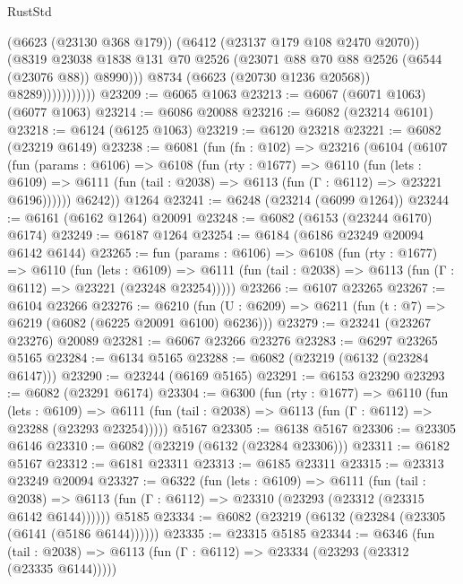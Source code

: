 \begin{lexlean}{RustStd}
\begin{coremodule}
                            (@6623 (@23130 @368 @179))
                            (@6412 (@23137 @179 @108 @2470 @2070))
                            (@8319
                              @23038
                              @1838
                              @131
                              @70
                              @2526
                              (@23071 @88 @70 @88 @2526 (@6544 (@23076 @88)) @8990)))
                          @8734
                          (@6623 (@20730 @1236 @20568))
                          @8289)))))))))))
@23209 := @6065 @1063
@23213 := @6067 (@6071 @1063) (@6077 @1063)
@23214 := @6086 @20088
@23216 := @6082 (@23214 @6101)
@23218 := @6124 (@6125 @1063)
@23219 := @6120 @23218
@23221 := @6082 (@23219 @6149)
@23238 := @6081
    (fun (fn : @102) =>
    @23216
      (@6104
        (@6107
          (fun (params : @6106) =>
          @6108
            (fun (rty : @1677) =>
            @6110
              (fun (lets : @6109) =>
              @6111 (fun (tail : @2038) => @6113 (fun (Γ : @6112) => @23221 @6196))))))
        @6242))
    @1264
@23241 := @6248 (@23214 (@6099 @1264))
@23244 := @6161 (@6162 @1264) @20091
@23248 := @6082 (@6153 (@23244 @6170) @6174)
@23249 := @6187 @1264
@23254 := @6184 (@6186 @23249 @20094 @6142 @6144)
@23265 := fun (params : @6106) =>
  @6108
    (fun (rty : @1677) =>
    @6110
      (fun (lets : @6109) =>
      @6111 (fun (tail : @2038) => @6113 (fun (Γ : @6112) => @23221 (@23248 @23254)))))
@23266 := @6107 @23265
@23267 := @6104 @23266
@23276 := @6210
    (fun (U : @6209) => @6211 (fun (t : @7) => @6219 (@6082 (@6225 @20091 @6100) @6236)))
@23279 := @23241 (@23267 @23276) @20089
@23281 := @6067 @23266 @23276
@23283 := @6297 @23265 @5165
@23284 := @6134 @5165
@23288 := @6082 (@23219 (@6132 (@23284 @6147)))
@23290 := @23244 (@6169 @5165)
@23291 := @6153 @23290
@23293 := @6082 (@23291 @6174)
@23304 := @6300
    (fun (rty : @1677) =>
    @6110
      (fun (lets : @6109) =>
      @6111 (fun (tail : @2038) => @6113 (fun (Γ : @6112) => @23288 (@23293 @23254)))))
    @5167
@23305 := @6138 @5167
@23306 := @23305 @6146
@23310 := @6082 (@23219 (@6132 (@23284 @23306)))
@23311 := @6182 @5167
@23312 := @6181 @23311
@23313 := @6185 @23311
@23315 := @23313 @23249 @20094
@23327 := @6322
    (fun (lets : @6109) =>
    @6111
      (fun (tail : @2038) =>
      @6113 (fun (Γ : @6112) => @23310 (@23293 (@23312 (@23315 @6142 @6144))))))
    @5185
@23334 := @6082 (@23219 (@6132 (@23284 (@23305 (@6141 (@5186 @6144))))))
@23335 := @23315 @5185
@23344 := @6346
    (fun (tail : @2038) => @6113 (fun (Γ : @6112) => @23334 (@23293 (@23312 (@23335 @6144)))))

\end{coremodule}
\end{lexlean}
